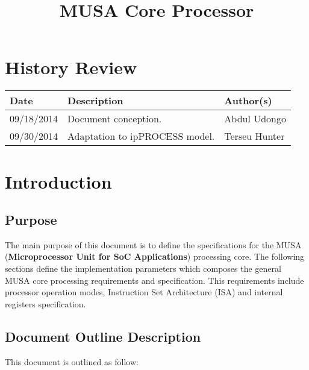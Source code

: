 \documentclass{article}
\title{MUSA Core Processor}
\begin{document}
 \capa

\section*{\center History Review}
    \vspace*{1cm}
    \begin{table}[ht] 
        \centering
        \begin{tabular}[pos]{|m{2cm} | m{7.2cm} | m{3.8cm}|} 
          \hline 
          \cellcolor[gray]{0.9}
          \textbf{Date} & \cellcolor[gray]{0.9}\textbf{Description} & \cellcolor[gray]{0.9}\textbf{Author(s)}\\ \hline
	        \small 09/18/2014 & \small Document conception. & \small Abdul Udongo \\ \hline
          \small 09/30/2014 & \small Adaptation to ipPROCESS model. & \small Terseu Hunter \\ \hline
        \end{tabular}
        \label{tab:revisoes}
    \end{table}

\newpage
  
\tableofcontents
\newpage

  \section{Introduction}
  \subsection{Purpose}
  The main purpose of this document is to define the specifications for the MUSA (\textbf{Microprocessor Unit for SoC Applications}) processing core. The following sections define the implementation parameters which composes the general MUSA core processing requirements and specification. This requirements include processor operation modes, Instruction Set Architecture (ISA) and internal registers specification.
  
  \subsection{Document Outline Description}
  This document is outlined as follow:
	
\end{document}
